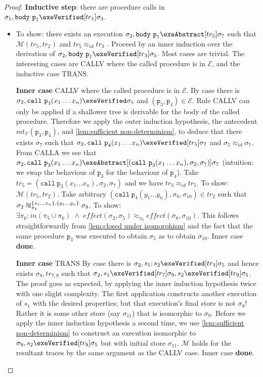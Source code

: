 \documentclass[runningheads,a4paper]{llncs}
\DeclareMathOperator{\band}{\bm{\;\land\;}}
\DeclareMathOperator{\suchthat}{:}
\newcommand*{\qvars}[2]{#1_{#2}}
\newcommand*{\identity}[0]{\mathit{id}}
\newcommand{\tr}{tr}
\newcommand*\iso{\approx}
\newcommand*{\equivmap}{\mathcal{E}}
\newcommand*{\muttermname}{\mathit{mt}}
\newcommand*{\mutterm}[3]{{\muttermname}_{#1}(#2,#3)}
\newcommand*\Vsemantics{\mathcal{V}}
\newcommand*{\callRuleAbstract}{\textnormal{CALLA}}
\newcommand*{\callRuleConcrete}{\textnormal{CALLV}}
\newcommand*{\callRuleVerified}{\callRuleConcrete{}}
\newcommand*{\blTrans}{TRANS}
\newcommand{\diff}{\mathit{effect}}
\newcommand*{\call}{\mathtt{call}}
\newcommand*{\body}{\mathtt{body}}
\newcommand*{\fun}{\texttt{p}}
\newcommand*{\bijection}[1]{\mathit{in}{\left(#1\right)}}
\newcommand*{\wiso}{%
  \mathrel{\vcenter{\offinterlineskip
  \hbox{$\sim$}\vskip-.35ex\hbox{$\sim$}\vskip-.35ex\hbox{$\sim$}}}}
\newcommand*{\mutR}{\mathcal{M}}
\newcommand*{\store}{\sigma}
\begin{document}
\begin{proof}
\noindent\textbf{Inductive step}: there are procedure calls in $\store_1,\body~\fun_1\exeVerified[\tr_1]\store_3$.
\begin{itemize}
\item[] To show: there exists an execution $\store_2,\body~\fun_1\exeAbstract[\tr_5]\store_7$ such that $\mutR(\tr_5,\tr_2)$ and $\tr_5\iso_\identity\tr_3$ \tagsix{}.
%
Proceed by an inner induction over the derivation of $\store_2,\body~\fun_1\exeVerified[\tr_3]\store_5$.
%
Most cases are trivial. The interesting cases are \callRuleVerified{} where the called procedure is in $\equivmap$, and the inductive case \blTrans{}.

\noindent\textbf{Inner case} \callRuleVerified{} where the called procedure is in $\equivmap$.
%
By case there is $\store_2,\call~\fun_3(x_1 \ldots x_n) \exeVerified\store_5$ and $(\fun_3,\fun_4) \in \equivmap$.
%
Rule \callRuleVerified{} can only be applied if a shallower tree is derivable for the body of the called procedure. Therefore we apply the outer induction hypothesis, the antecedent $\mutterm{\Vsemantics}{\fun_3}{\fun_4}$, and \cref{lem:sufficient non-determinism}, to deduce that there exists $\store_7$ such that $\store_2,\call~\fun_4(x_1 \ldots x_n) \exeVerified[\tr_5]\store_7$ and $\store_5\iso_{\identity}\store_7$. From \callRuleAbstract{} we see that $\store_2,\call~\fun_3(x_1 \ldots x_n) \exeAbstract[(\call~\fun_3(x_1 \ldots x_n),\store_2,\store_7)]\store_7$ (intuition: we swap the behaviour of $\fun_3$ for the behaviour of $\fun_4$). Take $\tr_5=(\call~\fun_3(x_1 \ldots x_n),\store_2,\store_7)$ and we have $\tr_3\iso_{\identity}\tr_5$.
%
To show: $\mutR(\tr_5,\tr_2)$. Take arbitrary $(\call~\fun_4(y_1 \ldots y_n),\store_8,\store_{10}) \in \tr_2$ such that
$\store_2 \wiso_{\pi_5}^{\{x_1 \ldots x_n\},\{y_1 \ldots y_n\}} \store_8$. To show: $\exists \pi_6 \suchthat \bijection{\pi_5 \cup \pi_6} \band \diff(\store_2,\store_5) \iso_{\pi_6} \diff(\store_8,\store_{10})$. This follows straightforwardly from \cref{lem:closed under isomorphism} and the fact that the same procedure $\fun_4$ was executed to obtain $\store_5$ as to obtain $\store_{10}$. Inner case \textbf{done}.

\noindent\textbf{Inner case} \blTrans{}
%
By case there is $\store_2,s_1;s_2 \exeVerified[\tr_3]\store_5$ and hence exists $\store_9,\qvars{\tr}{7,9}$ such that $\store_2,s_1 \exeVerified[\tr_7]\store_9,s_2 \exeVerified[\tr_9]\store_5$. The proof goes as expected, by applying the inner induction hypothesis twice with one slight complexity. The first application constructs another execution of $s_1$ with the desired properties; but that execution's final store is not $\store_9$! Rather it is some other store (say $\store_{11}$) that is isomorphic to $\store_9$. Before we apply the inner induction hypothesis a second time, we use \cref{lem:sufficient non-determinism} to construct an execution isomorphic to $\store_9,s_2 \exeVerified[\tr_9]\store_5$ but with initial store $\store_{11}$. $\mutR$ holds for the resultant traces by the same argument as the \callRuleVerified{} case. Inner case \textbf{done}.


\end{itemize}
\end{proof}
\end{document}
